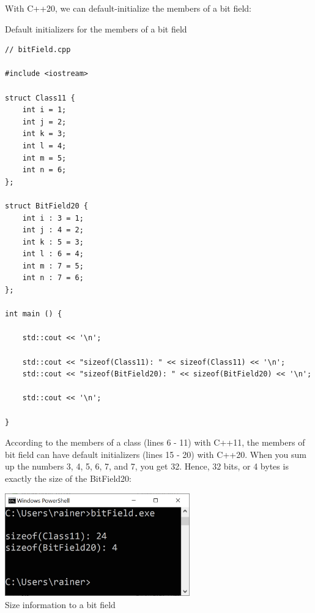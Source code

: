 With C++20, we can default-initialize the members of a bit field:

\noindent
Default initializers for the members of a bit field
\begin{lstlisting}[style=styleCXX]
// bitField.cpp

#include <iostream>

struct Class11 {
	int i = 1;
	int j = 2;
	int k = 3;
	int l = 4;
	int m = 5;
	int n = 6;
};

struct BitField20 {
	int i : 3 = 1;
	int j : 4 = 2;
	int k : 5 = 3;
	int l : 6 = 4;
	int m : 7 = 5;
	int n : 7 = 6;
};

int main () {
	
	std::cout << '\n';
	
	std::cout << "sizeof(Class11): " << sizeof(Class11) << '\n';
	std::cout << "sizeof(BitField20): " << sizeof(BitField20) << '\n';
	
	std::cout << '\n';

}
\end{lstlisting}

According to the members of a class (lines 6 - 11) with C++11, the members of bit field can have default initializers (lines 15 - 20) with C++20. When you sum up the numbers 3, 4, 5, 6, 7, and 7, you get 32. Hence, 32 bits, or 4 bytes is exactly the size of the BitField20:

\begin{center}
\includegraphics[width=0.6\textwidth]{content/3/chapter4/images/49.png}\\
Size information to a bit field
\end{center}

